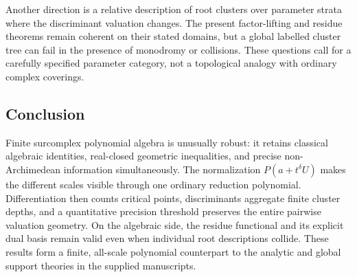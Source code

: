 \documentclass[11pt,letterpaper]{article}
\numberwithin{equation}{section}
\theoremstyle{definition}
\theoremstyle{remark}
\begin{document}
Another direction is a relative description of root clusters over
parameter strata where the discriminant valuation changes. The present
factor-lifting and residue theorems remain coherent on their stated
domains, but a global labelled cluster tree can fail in the presence of
monodromy or collisions. These questions call for a carefully specified
parameter category, not a topological analogy with ordinary complex
coverings.

\subsection{Conclusion}
Finite surcomplex polynomial algebra is unusually robust: it retains
classical algebraic identities, real-closed geometric inequalities, and
precise non-Archimedean information simultaneously. The normalization
$P(a+t^\delta U)$ makes the different scales visible through one ordinary
reduction polynomial. Differentiation then counts critical points,
discriminants aggregate finite cluster depths, and a quantitative
precision threshold preserves the entire pairwise valuation geometry.
On the algebraic side, the residue functional and its explicit dual basis
remain valid even when individual root descriptions collide. These
results form a finite, all-scale polynomial counterpart to the analytic
and global support theories in the supplied manuscripts.

\appendix
\end{document}
